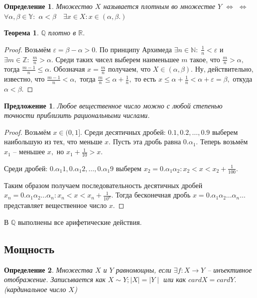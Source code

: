 \documentclass{article}
\newtheorem{Proposition}{Предложение}[section]
\newtheorem{Theorem}{Теорема}[section]
\newtheorem{Definition}{Определение}[section]
\begin{document}
\begin{Definition}
Множество $X$ называется плотным во множестве $Y$ \quad $\Leftrightarrow$ \quad $\Leftrightarrow$ $\forall \alpha, \beta \in \mathbb{Y}:$ $\alpha<\beta \quad \exists x\in X: x\in(\alpha,\beta.)$
\end{Definition}

\begin{Theorem}
$\mathbb{Q}$ плотно в $\mathbb{R}.$
\end{Theorem}
\begin{proof}
Возьмём $\varepsilon = \beta - \alpha > 0.$ По принципу Архимеда $\exists n\in \mathbb{N}: \; \frac{1}{n}<\varepsilon$ и $\exists m\in\mathbb{Z}: \; \frac{m}{n} >\alpha.$ Среди таких чисел выберем наименьшее $m$ такое, что $\frac{m}{n}>\alpha,$ тогда $\frac{m-1}{n}\leq \alpha.$ Обозначая $x=\frac{m}{n}$ получаем, что $X\in(\alpha,\beta).$ Ну, действительно, известно, что $\frac{m-1}{n}<\alpha,$ тогда $\frac{m}{n}\leq\alpha+\frac{1}{n},$ то есть $x\leq \alpha+
\frac{1}{n}<\alpha+\varepsilon=\beta,$ откуда $\alpha < \beta.$
\end{proof}

\begin{Proposition}
Любое вещественное число можно с любой степенью точности приблизить рациональными числами. 
\end{Proposition}
\begin{proof}
Возьмём $x\in(0,1].$ Среди десятичных дробей: $0.1, 0.2,\ldots, 0.9$ выберем наибольшую из тех, что меньше $x.$ Пусть эта дробь равна $0.\alpha_1.$ Теперь возьмём $x_1$ -- меньшее $x,$ но $x_1+\frac{1}{10}>x.$
\smallskip

Среди дробей: $0.\alpha_1 1, 0.\alpha_1 2,\ldots, 0.\alpha_1 9$ выберем $x_2=0.\alpha_1\alpha_2: x_2<x<x_2+\frac{1}{100}.$ 
\smallskip

Таким образом получаем последовательность десятичных дробей $x_n=0.\alpha_1\alpha_2\ldots\alpha_n: x_n<x<x_n+\frac{1}{10^n}.$ Тогда бесконечная дробь $x=0.\alpha_1\alpha_2\ldots\alpha_n\ldots$ представляет вещественное число $x.$
\end{proof}

В $\mathbb{Q}$ выполнены все арифетические действия.
\subsection{Мощность}
\begin{Definition}
Множества $X$ и $Y$ равномощны, если $\exists f:X\rightarrow Y$ -- инъективное отображение. Записывается как $X\sim Y; \mid X\mid=\mid Y\mid$ или как $cardX=cardY.$ (\textit{кардинальное число $X$})
\end{Definition}
\end{document}
